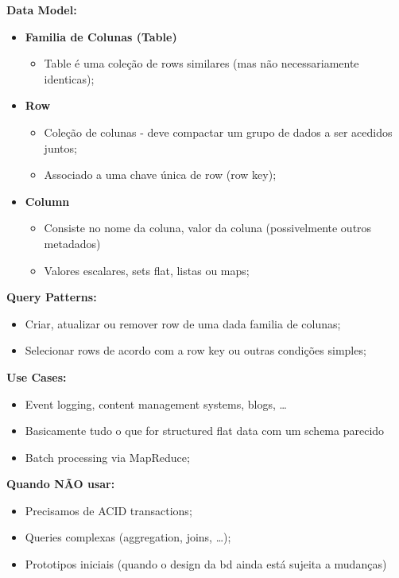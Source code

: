 \documentclass{article}
\begin{document}
\begin{flushleft}
  \textbf{Data Model:}
  \begin{itemize}
    \item \textbf{Familia de Colunas (Table)}
    \begin{itemize}
      \item Table é uma coleção de rows similares (mas não necessariamente identicas);
    \end{itemize}
    \item \textbf{Row}
    \begin{itemize}
      \item Coleção de colunas - deve compactar um grupo de dados a ser acedidos juntos;
      \item Associado a uma chave única de row (row key);
    \end{itemize}
    \item \textbf{Column}
    \begin{itemize}
      \item Consiste no nome da coluna, valor da coluna (possivelmente outros metadados)
      \item Valores escalares, sets flat, listas ou maps;
    \end{itemize}
  \end{itemize}

  \textbf{Query Patterns:}
  \begin{itemize}
    \item Criar, atualizar ou remover row de uma dada familia de colunas;
    \item Selecionar rows de acordo com a row key ou outras condições simples;
  \end{itemize}

  \textbf{Use Cases:}
  \begin{itemize}
    \item Event logging, content management systems, blogs, \dots
    \item Basicamente tudo o que for structured flat data com um schema parecido
    \item Batch processing via MapReduce;
  \end{itemize}

  \pagebreak

  \textbf{Quando NÃO usar:}
  \begin{itemize}
    \item Precisamos de ACID transactions;
    \item Queries complexas (aggregation, joins, \dots);
    \item Prototipos iniciais (quando o design da bd ainda está sujeita a mudanças)
  \end{itemize}
\end{flushleft}
\end{document}
